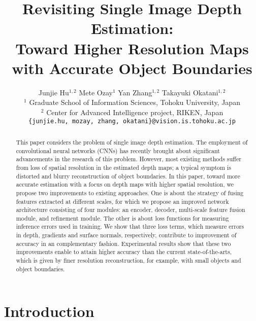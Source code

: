\documentclass[10pt,twocolumn,letterpaper]{article}
\begin{document}
\title{Revisiting Single Image Depth Estimation: \\
Toward Higher Resolution Maps
with Accurate Object Boundaries}

\author{ Junjie Hu$^{1,2}$ \hspace{1cm} Mete Ozay$^1$ \hspace{1cm} Yan Zhang$^{1,2}$ \hspace{1cm} Takayuki Okatani$^{1,2}$\\
$^1$ Graduate School of Information Sciences, Tohoku University, Japan \\
$^2$ Center for Advanced Intelligence project, RIKEN, Japan\\
{\tt\small \{junjie.hu, mozay, zhang, okatani\}@vision.is.tohoku.ac.jp}
}




\maketitle
\ifwacvfinal\thispagestyle{empty}\fi
\begin{abstract}
This paper considers the problem of single image depth estimation. 
The employment of convolutional neural networks (CNNs) has recently brought about significant advancements in the research of this problem. 
However, most existing methods suffer from loss of spatial resolution in the estimated depth maps; a typical symptom is distorted and blurry reconstruction of object boundaries.
In this paper, toward more accurate estimation with a focus on depth maps with higher spatial resolution, we propose two improvements to existing approaches.
One is about the strategy of fusing features extracted at different scales, for which we propose an improved network architecture consisting of four modules: an encoder, decoder, multi-scale feature fusion module, and refinement module.
The other is about loss functions for measuring inference errors used in training. We show that three loss terms, which measure errors in depth, gradients and surface normals, respectively, contribute to improvement of accuracy in an complementary fashion.
Experimental results show that these two improvements enable to attain higher accuracy than the current state-of-the-arts, which is given by finer resolution reconstruction, for example, with small objects and object boundaries. 
\end{abstract}

\section{Introduction}
\end{document}
